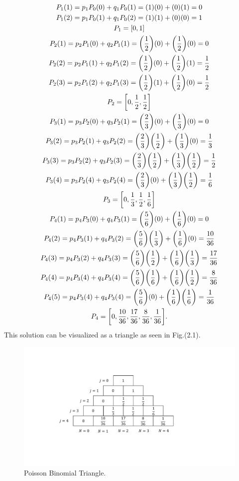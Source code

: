 \begin{gather*}
    P_1(1)=p_1 P_{0}(0)+q_1 P_{0}(1)=(1)(0)+(0)(1)=0\\
    P_1(2)=p_1 P_{0}(1)+q_1 P_{0}(2)=(1)(1)+(0)(0)=1\\
    P_1=[0,1]\\
    P_2(1)=p_2 P_{1}(0)+q_2 P_{1}(1)=\qty(\frac{1}{2})(0)+\qty(\frac{1}{2})(0)=0\\
    P_2(2)=p_2 P_{1}(1)+q_2 P_{1}(2)=\qty(\frac{1}{2})(0)+\qty(\frac{1}{2})(1)=\frac{1}{2}\\
    P_2(3)=p_2 P_{1}(2)+q_2 P_{1}(3)=\qty(\frac{1}{2})(1)+\qty(\frac{1}{2})(0)=\frac{1}{2}\\
    P_2=\qty[0,\frac{1}{2},\frac{1}{2}]\\
    P_3(1)=p_3 P_{2}(0)+q_3 P_{2}(1)=\qty(\frac{2}{3})(0)+\qty(\frac{1}{3})(0)=0\\
    P_3(2)=p_3 P_{2}(1)+q_3 P_{2}(2)=\qty(\frac{2}{3})\qty(\frac{1}{2})+\qty(\frac{1}{3})(0)=\frac{1}{3}\\
    P_3(3)=p_3 P_{2}(2)+q_3 P_{2}(3)=\qty(\frac{2}{3})\qty(\frac{1}{2})+\qty(\frac{1}{3})\qty(\frac{1}{2})=\frac{1}{2}\\
    P_3(4)=p_3 P_{2}(4)+q_3 P_{2}(4)=\qty(\frac{2}{3})(0)+\qty(\frac{1}{3})\qty(\frac{1}{2})=\frac{1}{6}\\
    P_3=\qty[0,\frac{1}{3},\frac{1}{2},\frac{1}{6}]\\
    P_4(1)=p_4 P_{3}(0)+q_4 P_{3}(1)=\qty(\frac{5}{6})(0)+\qty(\frac{1}{6})(0)=0\\
    P_4(2)=p_4 P_{3}(1)+q_4 P_{3}(2)=\qty(\frac{5}{6})\qty(\frac{1}{3})+\qty(\frac{1}{6})(0)=\frac{10}{36}\\
    P_4(3)=p_4 P_{3}(2)+q_4 P_{3}(3)=\qty(\frac{5}{6})\qty(\frac{1}{2})+\qty(\frac{1}{6})\qty(\frac{1}{3})=\frac{17}{36}\\
    P_4(4)=p_4 P_{3}(4)+q_4 P_{3}(4)=\qty(\frac{5}{6})\qty(\frac{1}{6})+\qty(\frac{1}{6})\qty(\frac{1}{2})=\frac{8}{36}\\
    P_4(5)=p_4 P_{3}(4)+q_4 P_{3}(4)=\qty(\frac{5}{6})(0)+\qty(\frac{1}{6})\qty(\frac{1}{6})=\frac{1}{36}\\
    P_4=\qty[0,\frac{10}{36},\frac{17}{36},\frac{8}{36},\frac{1}{36}].
\end{gather*}
This solution can be visualized as a triangle as seen in Fig.(2.1). 
\begin{figure}[H]
    \centering
    \includegraphics[scale=0.55]{figures/pdf/PBTriangle.pdf}
    \caption{Poisson Binomial Triangle.}
    \label{fig:Poisson Binomial Triangle}
\end{figure}

